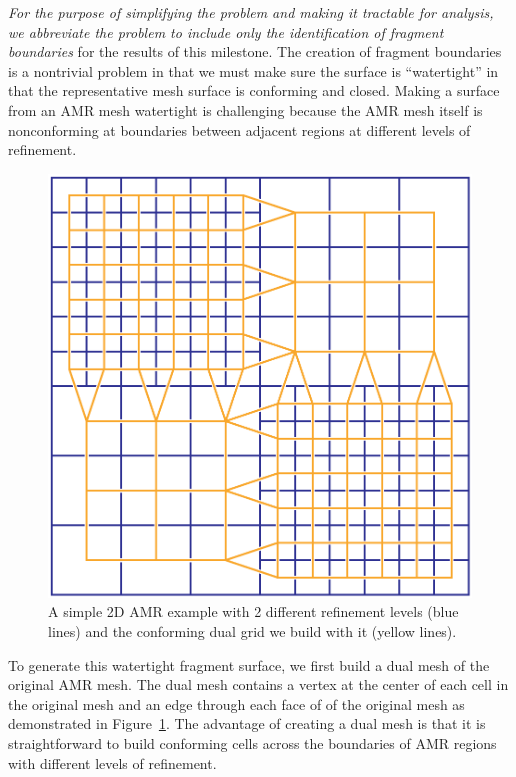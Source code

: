 \emph{For the purpose of simplifying the problem and making it tractable
  for analysis, we abbreviate the problem to include only the
  identification of fragment boundaries} for the results of this milestone.
The creation of fragment boundaries is a nontrivial problem in that we must
make sure the surface is ``watertight'' in that the representative mesh
surface is conforming and closed.  Making a surface from an AMR mesh
watertight is challenging because the AMR mesh itself is nonconforming at
boundaries between adjacent regions at different levels of refinement.

\begin{figure}[htb]
  \centering
  \includegraphics[width=5in]{figures/AMRDual}
  \caption{A simple 2D AMR example with 2 different refinement levels (blue
    lines) and the conforming dual grid we build with it (yellow lines).}
  \label{fig:AMRDual}
\end{figure}

To generate this watertight fragment surface, we first build a dual mesh of
the original AMR mesh.  The dual mesh contains a vertex at the center of
each cell in the original mesh and an edge through each face of of the
original mesh as demonstrated in Figure~\ref{fig:AMRDual}.  The advantage
of creating a dual mesh is that it is straightforward to build conforming
cells across the boundaries of AMR regions with different levels of
refinement.


